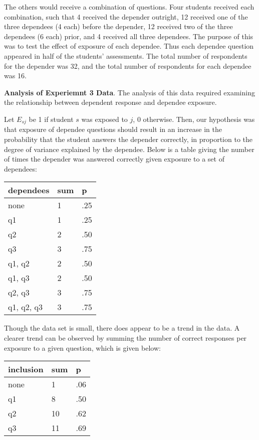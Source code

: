 \documentclass[]{interact}
\theoremstyle{plain}
\theoremstyle{definition}
\theoremstyle{remark}
\begin{document}
The others would receive a combination of questions. Four students received each
combination, such that 4 received the depender outright, 12 received one of the
three dependees (4 each) before the depender, 12 received two of the three
dependees (6 each) prior, and 4 received all three dependees.  The purpose of
this was to test the effect of exposure of each dependee.  Thus each dependee
question appeared in half of the students' assessments.  The total number of
respondents for the depender was 32, and the total number of respondents for
each dependee was 16. 

\textbf{Analysis of Experiemnt 3 Data}.  The analysis of this data required
examining the relationship between dependent response and dependee exposure.

Let $E_{sj}$ be 1 if student $s$ was exposed to $j$, 0 otherwise.  Then, our
hypothesis was that exposure of dependee questions should result in an increase
in the probability that the student answers the depender correctly, in
proportion to the degree of variance explained by the dependee.  Below is a
table giving the number of times the depender was answered correctly given
exposure to a set of dependees:

\begin{center}
\begin{tabular}{|l|l|l|}
\hline
dependees    & sum &  p   \\ \hline
none         &  1  & .25  \\ \hline
q1           &  1  & .25  \\ \hline
q2           &  2  & .50  \\ \hline
q3           &  3  & .75  \\ \hline
q1, q2       &  2  & .50  \\ \hline
q1, q3       &  2  & .50  \\ \hline
q2, q3       &  3  & .75  \\ \hline
q1, q2, q3   &  3  & .75  \\ \hline
\end{tabular}
\end{center}

Though the data set is small, there does appear to be a trend in the data. A
clearer trend can be observed by summing the number of correct responses per
exposure to a given question, which is given below:

\begin{center}
\begin{tabular}{|l|l|l|}
\hline
inclusion    & sum &  p   \\ \hline
none         &  1  & .06  \\ \hline
q1           &  8  & .50  \\ \hline
q2           & 10  & .62  \\ \hline
q3           & 11  & .69  \\ \hline
\end{tabular}
\end{center}
\end{document}
